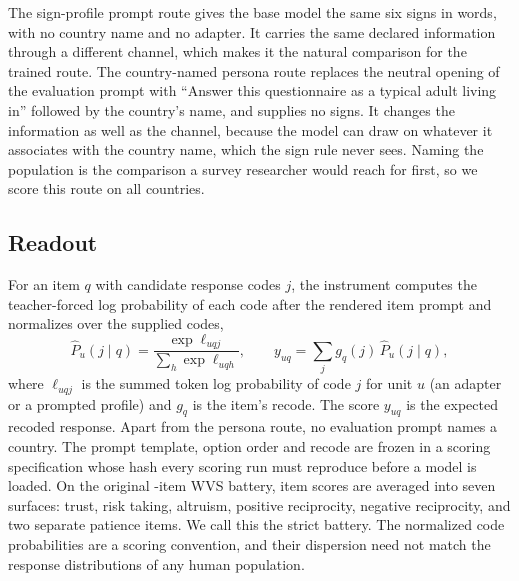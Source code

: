 The sign-profile prompt route gives the base model the same six signs in words, with no country name and no adapter. It carries the same declared information through a different channel, which makes it the natural comparison for the trained route. The country-named persona route replaces the neutral opening of the evaluation prompt with ``Answer this questionnaire as a typical adult living in'' followed by the country's name, and supplies no signs. It changes the information as well as the channel, because the model can draw on whatever it associates with the country name, which the sign rule never sees. Naming the population is the comparison a survey researcher would reach for first, so we score this route on all  countries.

\subsection{Readout}

For an item $q$ with candidate response codes $j$, the instrument computes the teacher-forced log probability of each code after the rendered item prompt and normalizes over the supplied codes,
\begin{equation}
\widehat P_u(j\mid q)=\frac{\exp \ell_{uqj}}{\sum_h \exp \ell_{uqh}},
\qquad
y_{uq}=\sum_j g_q(j)\,\widehat P_u(j\mid q),
\label{eq:readout}
\end{equation}
where $\ell_{uqj}$ is the summed token log probability of code $j$ for unit $u$ (an adapter or a prompted profile) and $g_q$ is the item's recode. The score $y_{uq}$ is the expected recoded response. Apart from the persona route, no evaluation prompt names a country. The prompt template, option order and recode are frozen in a scoring specification whose hash every scoring run must reproduce before a model is loaded. On the original -item WVS battery, item scores are averaged into seven surfaces: trust, risk taking, altruism, positive reciprocity, negative reciprocity, and two separate patience items. We call this the strict battery. The normalized code probabilities are a scoring convention, and their dispersion need not match the response distributions of any human population.
